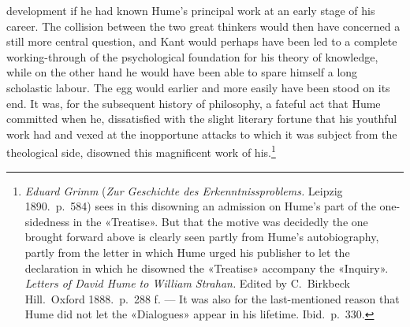 \documentclass[12pt,a4paper]{article}
\begin{document}
development if he had known Hume's principal work at an early stage of his
career. The collision between the two great thinkers would then have
concerned a still more central question, and Kant would perhaps have been led
to a complete working-through of the psychological foundation for his theory
of knowledge, while on the other hand he would have been able to spare himself
a long scholastic labour. The egg would earlier and more easily have been
stood on its end. It was, for the subsequent history of philosophy, a fateful
act that Hume committed when he, dissatisfied with the slight literary fortune
that his youthful work had and vexed at the inopportune attacks to which it was
subject from the theological side, disowned this magnificent work of
his.\footnote{\emph{Eduard Grimm} (\textit{Zur Geschichte des Erkenntnissproblems.}
Leipzig 1890.\ p.\ 584) sees in this disowning an admission on Hume's part of
the one-sidedness in the «Treatise». But that the motive was decidedly the
one brought forward above is clearly seen partly from Hume's autobiography,
partly from the letter in which Hume urged his publisher to let the
declaration in which he disowned the «Treatise» accompany the «Inquiry».
\textit{Letters of David Hume to William Strahan.} Edited by C.\ Birkbeck
Hill.\ Oxford 1888.\ p.\ 288 f. --- It was also for the last-mentioned reason
that Hume did not let the «Dialogues» appear in his lifetime. Ibid.\ p.\
330.}
\end{document}
